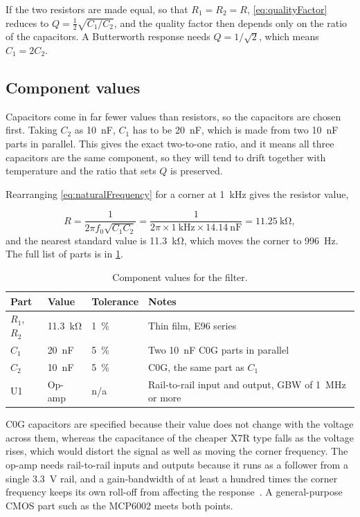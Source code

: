 If the two resistors are made equal, so that $R_1 = R_2 = R$,
\cref{eq:qualityFactor} reduces to $Q = \tfrac{1}{2}\sqrt{C_1/C_2}$, and the
quality factor then depends only on the ratio of the capacitors. A Butterworth
response needs $Q = 1/\sqrt{2}$, which means $C_1 = 2C_2$.

\subsection{Component values}

Capacitors come in far fewer values than resistors, so the capacitors are
chosen first. Taking $C_2$ as \qty{10}{\nano\farad}, $C_1$ has to be
\qty{20}{\nano\farad}, which is made from two \qty{10}{\nano\farad} parts in
parallel. This gives the exact two-to-one ratio, and it means all three
capacitors are the same component, so they will tend to drift together with
temperature and the ratio that sets $Q$ is preserved.

Rearranging \cref{eq:naturalFrequency} for a corner at \qty{1}{\kilo\hertz}
gives the resistor value,

\begin{equation}
  R = \frac{1}{2\pi f_0\sqrt{C_1 C_2}}
    = \frac{1}{2\pi \times \qty{1}{\kilo\hertz} \times \qty{14.14}{\nano\farad}}
    = \qty{11.25}{\kilo\ohm},
\end{equation}
and the nearest standard value is \qty{11.3}{\kilo\ohm}, which moves the
corner to \qty{996}{\hertz}. The full list of parts is in
\cref{tab:components}.

\begin{table}[htbp]
\centering
\begin{tabularx}{\textwidth}{@{} l l l X @{}}
\toprule
\textbf{Part} & \textbf{Value} & \textbf{Tolerance} & \textbf{Notes} \\
\midrule
$R_1$, $R_2$ & \qty{11.3}{\kilo\ohm} & \qty{1}{\percent} & Thin film, E96 series \\
$C_1$        & \qty{20}{\nano\farad} & \qty{5}{\percent} & Two \qty{10}{\nano\farad} C0G parts in parallel \\
$C_2$        & \qty{10}{\nano\farad} & \qty{5}{\percent} & C0G, the same part as $C_1$ \\
U1           & Op-amp                & n/a               & Rail-to-rail input and output, GBW of \qty{1}{\mega\hertz} or more \\
\bottomrule
\end{tabularx}
\caption{Component values for the filter.}
\label{tab:components}
\end{table}

C0G capacitors are specified because their value does not change with the
voltage across them, whereas the capacitance of the cheaper X7R type falls as
the voltage rises, which would distort the signal as well as moving the
corner frequency. The op-amp needs rail-to-rail inputs and outputs because it
runs as a follower from a single \qty{3.3}{\volt} rail, and a gain-bandwidth
of at least a hundred times the corner frequency keeps its own roll-off from
affecting the response~\cite{karki_sallen_key_2002}. A general-purpose CMOS
part such as the MCP6002 meets both points.
